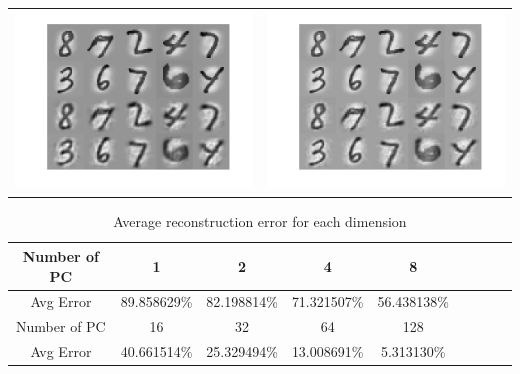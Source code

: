 \documentclass[paper=a4, fontsize=11pt]{scrartcl} %
\numberwithin{equation}{section} %
\numberwithin{figure}{section} %
\numberwithin{table}{section} %
\begin{document}
\begin{table}[H]
\begin{tabular}{cc}
	\includegraphics[scale=.3]{image_64}&
	\includegraphics[scale=.3]{image_128}
\end{tabular}
\end{table}

\begin{table}[H]
\caption{Average reconstruction error for each dimension}
\centering
\begin{tabular}{c|cccccccc}
  Number of PC  &  1  &  2  &  4  &  8   \\  \hline
  Avg Error  &  89.858629\%  &  82.198814\%  &  71.321507\%  &  56.438138\%  \\ \hline
  Number of PC  & 16  &  32  &  64  &  128 \\  \hline
  Avg Error & 40.661514\%  &  25.329494\%  &  13.008691\%  &  5.313130\% 
\end{tabular}
\end{table}
\end{document}
